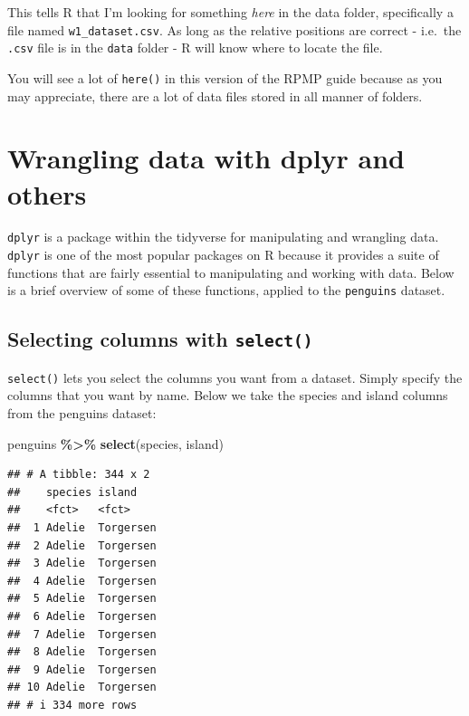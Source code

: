 \documentclass[
]{book}
\newenvironment{Shaded}{\begin{snugshade}}{\end{snugshade}}
\newcommand{\FunctionTok}[1]{\textcolor[rgb]{0.13,0.29,0.53}{\textbf{#1}}}
\newcommand{\NormalTok}[1]{#1}
\newcommand{\SpecialCharTok}[1]{\textcolor[rgb]{0.81,0.36,0.00}{\textbf{#1}}}
\begin{document}
This tells R that I'm looking for something \emph{here} in the data folder, specifically a file named \texttt{w1\_dataset.csv}. As long as the relative positions are correct - i.e.~the \texttt{.csv} file is in the \texttt{data} folder - R will know where to locate the file.

You will see a lot of \texttt{here()} in this version of the RPMP guide because as you may appreciate, there are a lot of data files stored in all manner of folders.

\section{Wrangling data with dplyr and others}\label{wrangling-data-with-dplyr-and-others}

\texttt{dplyr} is a package within the tidyverse for manipulating and wrangling data. \texttt{dplyr} is one of the most popular packages on R because it provides a suite of functions that are fairly essential to manipulating and working with data. Below is a brief overview of some of these functions, applied to the \texttt{penguins} dataset.

\subsection{\texorpdfstring{Selecting columns with \texttt{select()}}{Selecting columns with select()}}\label{selecting-columns-with-select}

\texttt{select()} lets you select the columns you want from a dataset. Simply specify the columns that you want by name. Below we take the species and island columns from the penguins dataset:

\begin{Shaded}
\begin{Highlighting}[]
\NormalTok{penguins }\SpecialCharTok{\%\textgreater{}\%}
  \FunctionTok{select}\NormalTok{(species, island)}
\end{Highlighting}
\end{Shaded}

\begin{verbatim}
## # A tibble: 344 x 2
##    species island   
##    <fct>   <fct>    
##  1 Adelie  Torgersen
##  2 Adelie  Torgersen
##  3 Adelie  Torgersen
##  4 Adelie  Torgersen
##  5 Adelie  Torgersen
##  6 Adelie  Torgersen
##  7 Adelie  Torgersen
##  8 Adelie  Torgersen
##  9 Adelie  Torgersen
## 10 Adelie  Torgersen
## # i 334 more rows
\end{verbatim}
\end{document}
